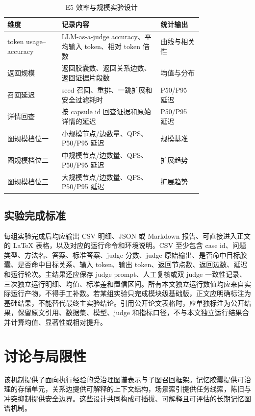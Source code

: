 \documentclass[a4paper,fleqn]{cas-sc}
\begin{document}
\begin{CJK*}{UTF8}{gbsn}
\begin{table}[t]
\centering
\scriptsize
\caption{E5 效率与规模实验设计}
\label{tab:e5-efficiency}
\setlength{\tabcolsep}{3pt}
\begin{tabular}{P{0.22\linewidth}P{0.40\linewidth}P{0.17\linewidth}}
\toprule
维度 & 记录内容 & 统计输出 \\
\midrule
token usage--accuracy & LLM-as-a-judge accuracy、平均输入 token、相对 token 倍数 & 曲线与相关性 \\
返回规模 & 返回胶囊数、返回关系边数、返回证据片段数 & 均值与分布 \\
召回延迟 & seed 召回、重排、一跳扩展和安全过滤耗时 & P50/P95 延迟 \\
详情回查 & 按 capsule id 回查证据和原始详情的延迟 & P50/P95 延迟 \\
图规模档位一 & 小规模节点/边数量、QPS、P50/P95 延迟 & 规模基准 \\
图规模档位二 & 中规模节点/边数量、QPS、P50/P95 延迟 & 扩展趋势 \\
图规模档位三 & 大规模节点/边数量、QPS、P50/P95 延迟 & 扩展趋势 \\
\bottomrule
\end{tabular}
\end{table}

\subsection{实验完成标准}

每组实验完成后均应输出 CSV 明细、JSON 或 Markdown 报告、可直接进入正文的 LaTeX 表格，以及对应的运行命令和环境说明。CSV 至少包含 case id、问题类型、方法名、答案、标准答案、judge 分数、judge 原始输出、是否命中目标胶囊、是否命中目标关系、输入 token、输出 token、返回节点数、返回边数、延迟和运行轮次。主结果还应保存 judge prompt、人工复核或双 judge 一致性记录、三次独立运行明细、均值、标准差和置信区间。所有本文独立运行数值均应来自实际运行产物，不得手工补数。若某组实验只完成模块级基础版，正文应明确标注为基础结果，不能替代最终主实验结论。引用公开论文表格时，应单独标注为公开结果，保留原文引用、数据集、模型、judge 和指标口径，不与本文独立运行结果合并计算均值、显著性或相对提升。

\section{讨论与局限性}

该机制提供了面向执行经验的受治理图谱表示与子图召回框架。记忆胶囊提供可治理的存储单元，关系边提供可解释的上下文结构，场景索引提供任务线索，陈旧与冲突抑制提供安全边界。这些设计共同构成可插拔、可解释且可评估的长期记忆图谱机制。


\end{CJK*}
\end{document}

